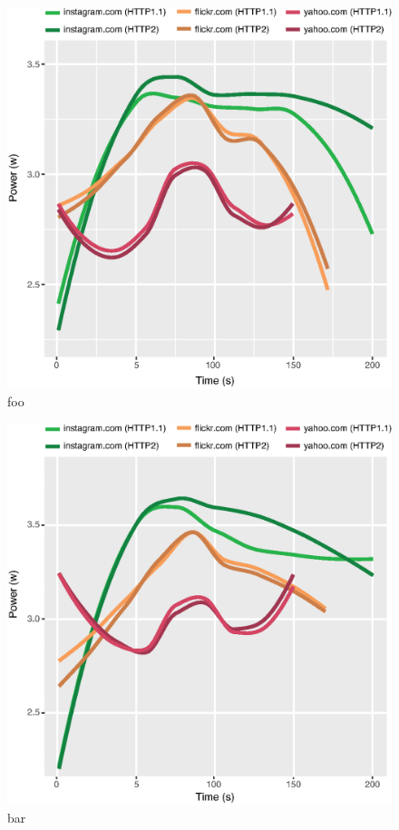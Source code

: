 \documentclass{article}
\begin{document}
\begin{figure}[h!]
    \centering
    \includegraphics[width=\linewidth]{images/average}
    \caption{foo}
    \label{fig:average}
\end{figure}

\begin{figure}[h!]
    \centering
    \includegraphics[width=\linewidth]{images/average-vpn}
    \caption{bar}
    \label{fig:average-vpn}
\end{figure}
\end{document}
